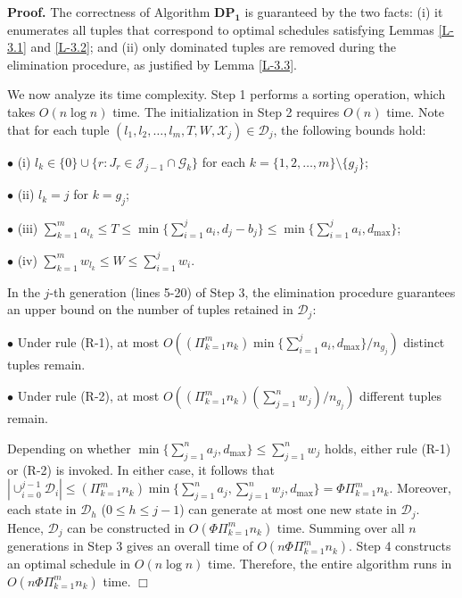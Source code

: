 \documentclass[12pt, eqno, limlimits]{article}
\begin{document}
\begin{sloppypar}
        \noindent \textbf{Proof.} The correctness of Algorithm $\mathbf{DP_1}$ is guaranteed by the two facts: (i) it enumerates all tuples that correspond to optimal schedules satisfying Lemmas \ref{L-3.1} and \ref{L-3.2}; and (ii) only dominated tuples are removed during the elimination procedure, as justified by Lemma \ref{L-3.3}.
        
        We now analyze its time complexity. Step 1 performs a sorting operation, which takes $O(n\log n)$ time. The initialization in Step 2 requires $O(n)$ time. Note that for each tuple $(l_1, l_2, \ldots, l_m, T, W, \mathcal{X}_j) \in \mathcal{D}_j$, the following bounds hold: 
        
        $\bullet$ (i) $l_k \in \{0\} \cup \{r: J_r \in \mathcal{J}_{j-1} \cap \mathcal{G}_k\}$ for each $k=\{1, 2, \ldots, m\} \setminus \{g_j\}$;
        
        $\bullet$ (ii) $l_{k}=j$ for $k=g_j$; 
        
        $\bullet$ (iii) $\sum_{k=1}^m a_{l_k} \leq T \leq \min\{\sum_{i=1}^j a_i, d_j-b_j\} \leq \min\{\sum_{i=1}^j a_i, d_{\max}\}$; 
        
        $\bullet$ (iv) $\sum_{k=1}^m w_{l_k} \leq W \leq \sum_{i=1}^j w_i$.  
        
        \noindent In the $j$-th generation (lines 5-20) of Step 3,  the elimination procedure guarantees an upper bound on the number of tuples retained in  $\mathcal{D}_j$:
        
        $\bullet$ Under rule (R-1), at most $O((\Pi_{k=1}^m n_k)\min\{\sum_{i=1}^j a_i, d_{\max}\}/n_{g_j})$ distinct tuples remain.
        
        $\bullet$ Under rule (R-2), at most $O((\Pi_{k=1}^m n_k)(\sum_{j=1}^n w_j)/n_{g_j})$ different tuples remain.
        
        \noindent Depending on whether $\min\{\sum_{j=1}^n a_j, d_{\max}\} \leq \sum_{j=1}^n w_j$ holds, either rule (R-1) or (R-2) is invoked. In either case, it follows that $|\cup_{i=0}^{j-1} \mathcal{D}_i| \leq (\Pi_{k=1}^m n_k) \min\{\sum_{j=1}^n a_j, \sum_{j=1}^n w_j, d_{\max}\}= \Phi \Pi_{k=1}^m n_k$. Moreover, each state in $\mathcal{D}_h$ ($0 \leq h \leq j-1$) can generate at most one new state in $\mathcal{D}_j$. Hence, $\mathcal{D}_j$ can be constructed in $O(\Phi \Pi_{k=1}^m n_k)$ time. Summing over all $n$ generations in Step 3 gives an overall time of $O(n \Phi \Pi_{k=1}^m n_k)$. Step 4 constructs an optimal schedule in $O(n \log n)$ time. Therefore, the entire algorithm runs in $O(n \Phi \Pi_{k=1}^m n_k)$ time. \hfill$\Box$\\
        

\end{sloppypar}
\end{document}
